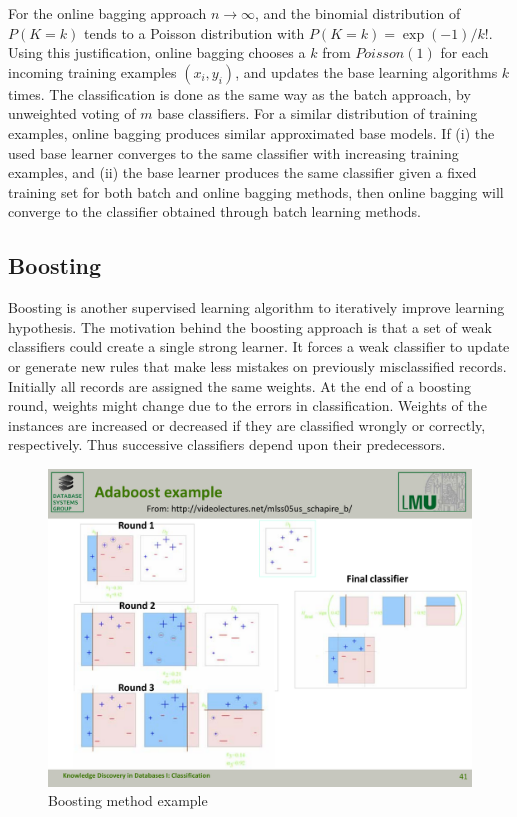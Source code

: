 For the online bagging approach $n \rightarrow \infty$, and the binomial distribution of $P(K=k)$ tends to a Poisson distribution with $P(K=k) = \exp(-1)/k!$. Using this justification, online bagging chooses a $k $ from $Poisson(1)$ for each incoming training examples $(x_i, y_i)$, and updates the base learning algorithms $k$ times. The classification is done as the same way as the batch approach, by unweighted voting of $m$ base classifiers. For a similar distribution of training examples, online bagging produces similar approximated base models. If (i) the used base learner converges to the same classifier with increasing training examples, and (ii) the base learner produces the same classifier given a fixed training set for both batch and online bagging methods, then online bagging will converge to the classifier obtained through batch learning methods.


\subsection{Boosting}
Boosting is another supervised learning algorithm to iteratively improve learning hypothesis. The motivation behind the boosting approach is that a set of weak classifiers could create a single strong learner. It forces a weak classifier to update or generate new rules that make less mistakes on previously misclassified records. Initially all records are assigned the same weights. At the end of a boosting round, weights might change due to the errors in classification. Weights of the instances are increased or decreased if they are classified wrongly or correctly, respectively. Thus successive classifiers depend upon their predecessors. 
\begin{figure}[htbp]
    \begin{center}
        \includegraphics[width=12.0cm]{figs/boosting.pdf}
        \caption{Boosting method example}
        \label{fig:bg:bosting}
    \end{center}
\end{figure}

